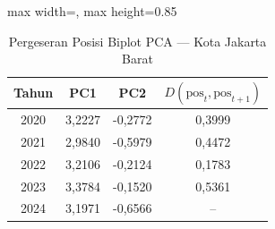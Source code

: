 \begin{table}[H]
\centering
\caption{Pergeseran Posisi Biplot PCA --- Kota Jakarta Barat} \label{tab:appjarak_pca_skor_kota_jakarta_barat}
\begin{adjustbox}{max width=\textwidth, max height=0.85\textheight}
\begin{tabular}{|c|c|c|c|}
\hline
\textbf{Tahun} & \textbf{PC1} & \textbf{PC2} & \textbf{$D(\text{pos}_t, \text{pos}_{t+1})$} \\
\hline
2020 & 3,2227 & -0,2772 & 0,3999 \\
2021 & 2,9840 & -0,5979 & 0,4472 \\
2022 & 3,2106 & -0,2124 & 0,1783 \\
2023 & 3,3784 & -0,1520 & 0,5361 \\
2024 & 3,1971 & -0,6566 & -- \\
\hline
\end{tabular}
\end{adjustbox}
\end{table}